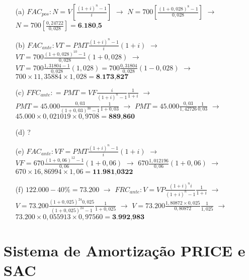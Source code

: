 \documentclass[report]{uftex}
\begin{document}
\begin{itemize}
	\item[(a)] $FAC_{pos}: N = V[\frac{(1+i)^n-1}{i}]$ $\rightarrow$ $N = 700[\frac{(1+0,028)^8-1}{0,028}]$ $\rightarrow$ $N = 700[\frac{0,24722}{0,028}] = \textbf{6.180,5}$ 
	
	\item[(b)] $FAC_{ante}: VT = PMT\frac{(1+i)^n-1}{i}(1+i)$ $\rightarrow$ $VT = 700\frac{(1+0,028)^{10}-1}{0,028}(1+0,028)$ $\rightarrow$ $VT = 700\frac{1,31804 -1}{0,028}(1,028) = 700\frac{0,31804}{0,028}(1-0,028)$ $\rightarrow$ $700\times11,35884\times1,028 = \textbf{8.173,827}$ 
	
	\item[(c)] $FFC_{ante}: = PMT = VF\frac{i}{(1+i)^n-1}\frac{1}{1+i}$ $\rightarrow$ $PMT = 45.000\frac{0,03}{(1+0,03)^{30}-1}\frac{1}{1+0,03}$ $\rightarrow$ $PMT = 45.000\frac{0,03}{1,42726}\frac{1}{0,03}$ $\rightarrow$ $45.000\times0,021019\times0,9708 = \textbf{889,860}$
	
	\item[(d)] ?
	
	\item[(e)] $FAC_{ante}: VF = PMT\frac{(1+i)^n-1}{i}(1+i)$ $\rightarrow$ $VF = 670\frac{(1+0,06)^{12}-1}{0,06}(1+0,06)$ $\rightarrow$ $670\frac{1,012196}{0,06}(1+0,06)$ $\rightarrow$ $670\times16,86994\times1,06 = \textbf{11.981,0322}$
		
	\item[(f)] $122.000 - 40\% = 73.200$ $\rightarrow$ $FRC_{ante}: V = VP\frac{(1+i)^ni}{(1+i)^n-1}\frac{1}{1+i}$ $\rightarrow$ $V = 73.200\frac{(1+0,025)^{24}0,025}{(1+0,025)^{24}-1}\frac{1}{1+0,025}$ $\rightarrow$ $V = 73.200\frac{1,80872\times0,025}{0,80872}\frac{1}{1,025}$ $\rightarrow$ $73.200\times0,055913\times0,97560 = \textbf{3.992,983}$
	
\end{itemize}

\section{Sistema de Amortização PRICE e SAC}
\end{document}
